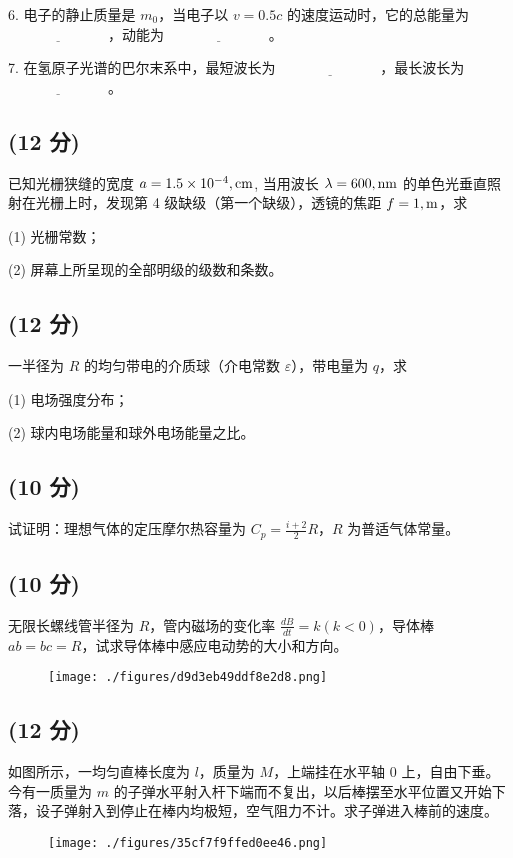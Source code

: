 6. 电子的静止质量是 $m_0$，当电子以 $v = 0.5c$ 的速度运动时，它的总能量为 $\underline{\hspace{3cm}}$，动能为 $\underline{\hspace{3cm}}$。

7. 在氢原子光谱的巴尔末系中，最短波长为 $\underline{\hspace{3cm}}$，最长波长为 $\underline{\hspace{3cm}}$。
\subsection{(12 分)}
已知光栅狭缝的宽度 $a = 1.5 \times 10^{-4} \\, \text{cm}$, 当用波长 $\lambda = 600 \\, \text{nm}$ 的单色光垂直照射在光栅上时，发现第 4 级缺级（第一个缺级），透镜的焦距 $f = 1 \\, \text{m}$，求

(1) 光栅常数；

(2) 屏幕上所呈现的全部明级的级数和条数。
\subsection{(12 分)}
一半径为 $R$ 的均匀带电的介质球（介电常数 $\varepsilon$），带电量为 $q$，求

(1) 电场强度分布；

(2) 球内电场能量和球外电场能量之比。
\subsection{(10 分)}
试证明：理想气体的定压摩尔热容量为 $C_p = \frac{i + 2}{2} R$，$R$ 为普适气体常量。
\subsection{(10 分)}
无限长螺线管半径为 $R$，管内磁场的变化率 $\frac{dB}{dt} = k (k < 0)$，导体棒 $ab = bc = R$，试求导体棒中感应电动势的大小和方向。
\begin{figure}[ht]
\centering
\texttt{[image: ./figures/d9d3eb49ddf8e2d8.png]}
\caption{} \label{fig_NJU08_3}
\end{figure}
\subsection{(12 分)}
如图所示，一均匀直棒长度为 \( l \)，质量为 \( M \)，上端挂在水平轴 0 上，自由下垂。今有一质量为 \( m \) 的子弹水平射入杆下端而不复出，以后棒摆至水平位置又开始下落，设子弹射入到停止在棒内均极短，空气阻力不计。求子弹进入棒前的速度。
\begin{figure}[ht]
\centering
\texttt{[image: ./figures/35cf7f9ffed0ee46.png]}
\caption{} \label{fig_NJU08_4}
\end{figure}
